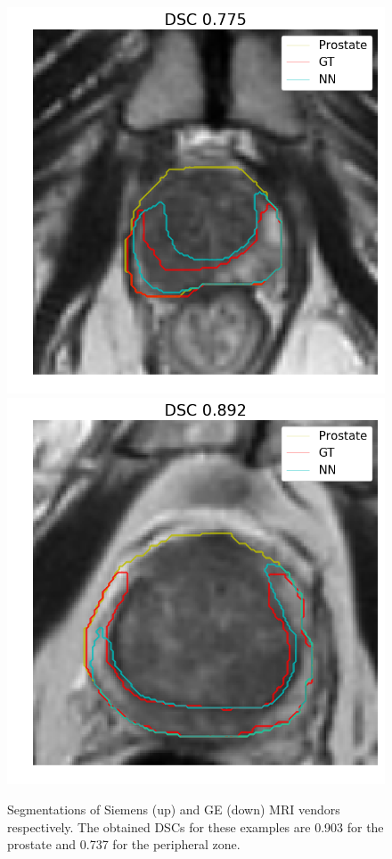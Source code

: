 \begin{figure}[h]
    \includegraphics[totalheight=.2\textheight]{imgs/results/PZ_GE__GE_yes_ROI_MEAN_Case-0510.png}
    \includegraphics[totalheight=.2\textheight]{imgs/results/PZ_GE__GE_yes_ROI_MAX_Case-0441.png}
    \caption{Segmentations of Siemens (up) and GE (down) MRI vendors respectively. The obtained DSCs for these examples are 0.903 for the prostate and 0.737 for the peripheral zone.}
    \label{fig:ressegpz}
\end{figure}
